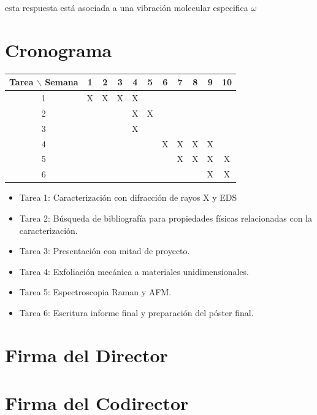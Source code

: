\documentclass{article}
\begin{document}
esta respuesta está asociada a una vibración molecular especifica $\omega$


\section{Cronograma}

\begin{table}[htb]
	\begin{tabular}{|c|cccccccccc|}
	\hline
	Tarea $\backslash$ Semana & 1 & 2 & 3 & 4 & 5 & 6 & 7 & 8 & 9 & 10\\
	\hline
	1 & X & X & X & X &   &   &   &  &  &        \\
	2 &   &  & & X & X &  &  &   &   &   \\
	3 &   &   &   & X  &   &   &   & &   &    \\
	4 & & & & & &X &X &X &X &               \\
	5 &  &  &  &  &  &  &  X& X & X & X    \\
	6& & & & & & & & &X & X              \\
	\hline
	\end{tabular}
\end{table}
\vspace{1mm}

\begin{itemize}
	\item Tarea 1: Caracterización con difracción de rayos X y EDS
	\item Tarea 2: Búsqueda de bibliografía para propiedades físicas relacionadas con la caracterización.
	\item Tarea 3: Presentación con mitad de proyecto.
	\item Tarea 4: Exfoliación mecánica a materiales unidimensionales.
	\item Tarea 5: Espectroscopia Raman y AFM.
	\item Tarea 6: Escritura informe final y preparación del póster final. 

\end{itemize}

\section*{Firma del Director}
\vspace{1.5cm}

\section*{Firma del Codirector}
\vspace{1.5cm}



\end{document}
